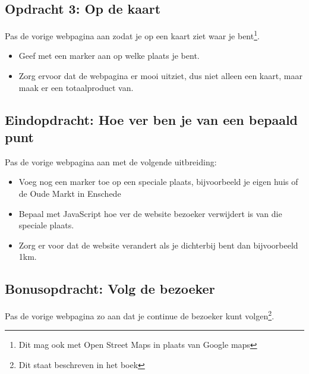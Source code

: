 \documentclass[a4paper]{report}
\begin{document}
\subsection*{Opdracht 3: Op de kaart}
Pas de vorige webpagina aan zodat je op een kaart ziet waar je bent\footnote{Dit mag ook met Open Street Maps in plaats van Google maps}.

\begin{itemize}
	\item Geef met een marker aan op welke plaats je bent.
	\item Zorg ervoor dat de webpagina er mooi uitziet, dus niet alleen een kaart, maar maak er een totaalproduct van.
\end{itemize}

\subsection*{Eindopdracht: Hoe ver ben je van een bepaald punt}
Pas de vorige webpagina aan met de volgende uitbreiding:
\begin{itemize}
	\item Voeg nog een marker toe op een speciale plaats, bijvoorbeeld je eigen huis of de Oude Markt in Enschede
	\item Bepaal met JavaScript hoe ver de website bezoeker verwijdert is van die speciale plaats.
	\item Zorg er voor dat de website verandert als je dichterbij bent dan bijvoorbeeld 1km.
\end{itemize}

\subsection*{Bonusopdracht: Volg de bezoeker}
Pas de vorige webpagina zo aan dat je continue de bezoeker kunt volgen\footnote{Dit staat beschreven in het boek}.
\end{document}
